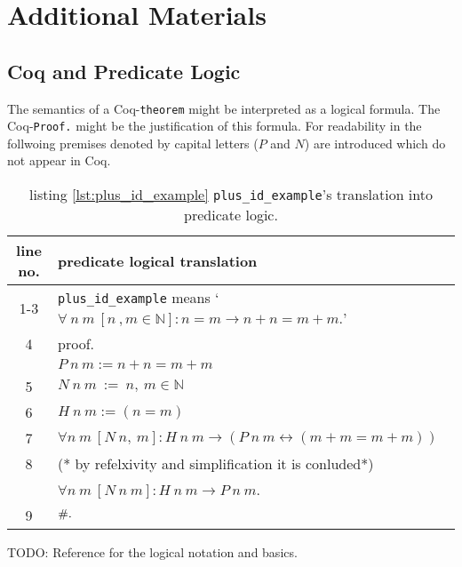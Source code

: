 \section{Additional Materials}\label{app:AdditionalMaterials}

\subsection{Coq and Predicate Logic} \label{subsec:CoqAndPredicateLogic}
	The semantics of a Coq-\lstinline!theorem! might be interpreted as a logical formula.
	The Coq-\lstinline!Proof.! might be the justification of this formula. 
	For readability in the follwoing premises denoted by capital letters ($P$ and $N$) are introduced which do not appear in Coq.
	\begin{table}[h]
		\begin{center}
			\begin{tabular}{|c|l|}
			    \hline
	 			line no.  &  predicate logical translation \\  \hline
		     	  1-3    %
		                  & \lstinline!plus_id_example! means `$ \forall\ n\ m\ [n\ , m \in \mathbb{N}]: n = m \rightarrow n+n = m+m.$'\\ \hline        
		     	  4       & proof. \\     	     	      	                      
		                  &   $ P\ n\ m:= n+n = m+m$    \\ \hline
		          5       &   $N \ n \ m \ := \ n,\ m \in \mathbb{N}$       \\ \hline       
		          6       &   $ H\ n\ m :=( n= m)$ \\        
		    	      7       &   $ \forall n \ m\ [N \ n,\ m]: H\ n\ m \rightarrow (P\ n\ m \leftrightarrow( m+m = m+m))$\\   \hline 
		          8       &   (* by refelxivity and simplification it is conluded*) \\
		                  & $\forall n\ m\ [ N\ n\ m]: H\ n\ m  \rightarrow P\ n\ m$.  \\  \hline
		          9       & $\qed.$\\ \hline        	          
	        		\end{tabular}
		\end{center}
		\label{tab:CoqAndPreciateLogic}
		\caption{listing \ref{lst:plus_id_example} \lstinline!plus_id_example!'s translation into predicate logic.} 
	\end{table}

TODO: Reference for the logical notation and basics.